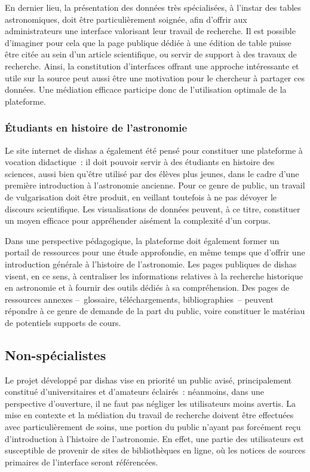 \documentclass[a4paper,12pt,twoside]{book}
\newcommand{\dishas}{\gls{dishas}\xspace}
\begin{document}
En dernier lieu, la présentation des données très spécialisées, à l'instar des tables astronomiques, doit être particulièrement soignée, afin d'offrir aux administrateurs une interface valorisant leur travail de recherche. Il est possible d'imaginer pour cela que la page publique dédiée à une édition de table puisse être citée au sein d'un article scientifique, ou servir de support à des travaux de recherche. Ainsi, la constitution d'interfaces offrant une approche intéressante et utile sur la source peut aussi être une motivation pour le chercheur à partager ces données. Une médiation efficace participe donc de l'utilisation optimale de la plateforme.

			\subsubsection{Étudiants en histoire de l'astronomie}
Le site internet de \dishas a également été pensé pour constituer une plateforme à vocation didactique~: il doit pouvoir servir à des étudiants en histoire des sciences, aussi bien qu'être utilisé par des élèves plus jeunes, dans le cadre d'une première introduction à l'astronomie ancienne. Pour ce genre de public, un travail de vulgarisation doit être produit, en veillant toutefois à ne pas dévoyer le discours scientifique. Les visualisations de données peuvent, à ce titre, constituer un moyen efficace pour appréhender aisément la complexité d'un corpus.

Dans une perspective pédagogique, la plateforme doit également former un portail de ressources pour une étude approfondie, en même temps que d'offrir une introduction générale à l'histoire de l'astronomie. Les pages publiques de \dishas visent, en ce sens, à centraliser les informations relatives à la recherche historique en astronomie et à fournir des outils dédiés à sa compréhension. Des pages de ressources annexes –~glossaire, téléchargements, bibliographies~– peuvent répondre à ce genre de demande de la part du public, voire constituer le matériau de potentiels supports de cours.

		\subsection{Non-spécialistes}
Le projet développé par \dishas vise en priorité un public avisé, principalement constitué d’universitaires et d’amateurs éclairés~: néanmoins, dans une perspective d'ouverture, il ne faut pas négliger les utilisateurs moins avertis. La mise en contexte et la médiation du travail de recherche doivent être effectuées avec particulièrement de soins, une portion du public n'ayant pas forcément reçu d'introduction à l'histoire de l'astronomie. En effet, une partie des utilisateurs est susceptible de provenir de sites de bibliothèques en ligne, où les notices de sources primaires de l'interface seront référencées.
\end{document}
